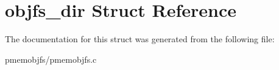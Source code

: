 \hypertarget{structobjfs__dir}{}\section{objfs\+\_\+dir Struct Reference}
\label{structobjfs__dir}


The documentation for this struct was generated from the following file\+:\begin{DoxyCompactItemize}
\item 
pmemobjfs/pmemobjfs.\+c\end{DoxyCompactItemize}
